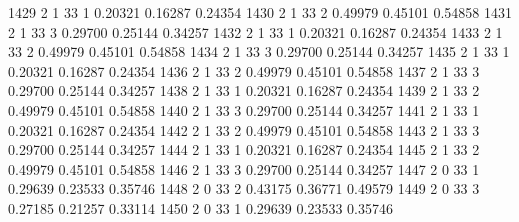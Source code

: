 \documentclass{article}
\begin{document}
\begin{Woutput}
1429      2       1      33       1       0.20321    0.16287    0.24354
1430      2       1      33       2       0.49979    0.45101    0.54858
1431      2       1      33       3       0.29700    0.25144    0.34257
1432      2       1      33       1       0.20321    0.16287    0.24354
1433      2       1      33       2       0.49979    0.45101    0.54858
1434      2       1      33       3       0.29700    0.25144    0.34257
1435      2       1      33       1       0.20321    0.16287    0.24354
1436      2       1      33       2       0.49979    0.45101    0.54858
1437      2       1      33       3       0.29700    0.25144    0.34257
1438      2       1      33       1       0.20321    0.16287    0.24354
1439      2       1      33       2       0.49979    0.45101    0.54858
1440      2       1      33       3       0.29700    0.25144    0.34257
1441      2       1      33       1       0.20321    0.16287    0.24354
1442      2       1      33       2       0.49979    0.45101    0.54858
1443      2       1      33       3       0.29700    0.25144    0.34257
1444      2       1      33       1       0.20321    0.16287    0.24354
1445      2       1      33       2       0.49979    0.45101    0.54858
1446      2       1      33       3       0.29700    0.25144    0.34257
1447      2       0      33       1       0.29639    0.23533    0.35746
1448      2       0      33       2       0.43175    0.36771    0.49579
1449      2       0      33       3       0.27185    0.21257    0.33114
1450      2       0      33       1       0.29639    0.23533    0.35746


\end{Woutput}
\end{document}
